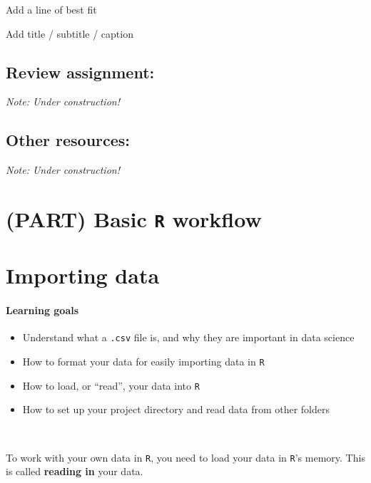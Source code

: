 \documentclass[
]{book}
\providecommand{\tightlist}{%
  \setlength{\itemsep}{0pt}\setlength{\parskip}{0pt}}
\begin{document}
Add a line of best fit

Add title / subtitle / caption

\hypertarget{review-assignment-7}{%
\section{Review assignment:}\label{review-assignment-7}}

\emph{Note: Under construction!}

\hypertarget{other-resources-5}{%
\section{Other resources:}\label{other-resources-5}}

\emph{Note: Under construction!}

\hypertarget{part-basic-r-workflow}{%
\chapter*{\texorpdfstring{(PART) Basic \texttt{R} workflow}{(PART) Basic R workflow}}\label{part-basic-r-workflow}}

\hypertarget{importing-data}{%
\chapter{Importing data}\label{importing-data}}

\hypertarget{learning-goals-8}{%
\subsubsection*{Learning goals}\label{learning-goals-8}}

\begin{itemize}
\tightlist
\item
  Understand what a \texttt{.csv} file is, and why they are important in data science
\item
  How to format your data for easily importing data in \texttt{R}
\item
  How to load, or ``read'', your data into \texttt{R}
\item
  How to set up your project directory and read data from other folders
\end{itemize}

~

To work with your own data in \texttt{R}, you need to load your data in \texttt{R}'s memory. This is called \textbf{reading in} your data.
\end{document}
